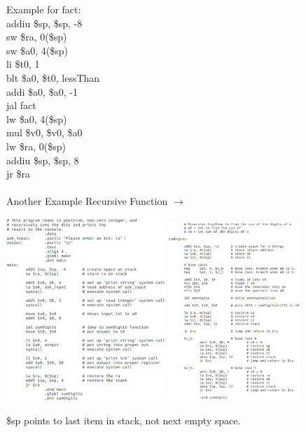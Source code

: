 \documentclass{article}
\begin{document}
  \begin{multicols}{3}
Example for fact:\\
  addiu \$sp, \$sp, -8\\
  sw \$ra, 0(\$sp)\\
  sw \$a0, 4(\$sp)\\
  li \$t0, 1\\
  blt \$a0, \$t0, lessThan\\
  addi \$a0, \$a0, -1\\
  jal fact \\
  lw \$a0, 4(\$sp)\\
  mul \$v0, \$v0, \$a0\\
  lw \$ra, 0(\$sp)\\
  addiu \$sp, \$sp, 8\\
  jr \$ra \\~\\
  Another Example Recursive Function $\to$

    \includegraphics[width=60mm]{mipsrecursive1.png}
    \includegraphics[width=50mm]{mipsrecursive2.png}

  \end{multicols}
  \$sp points to last item in stack, not next empty space. \\
\end{document}
